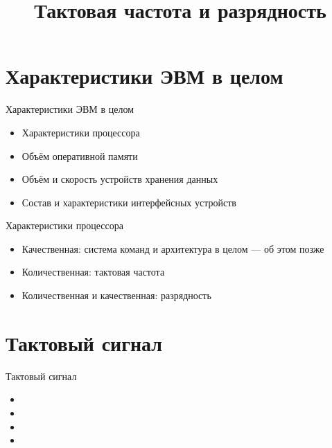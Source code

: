 \documentclass[xetex,aspectratio=43]{beamer}
\title[Тактовая частота и разрядность]{Тактовая частота и разрядность}
\begin{document}
\titleslide

\tocslide

\section{Характеристики ЭВМ в целом}

\begin{frame}{Характеристики ЭВМ в целом}
    \begin{itemize}
        \item Характеристики процессора
        \item Объём оперативной памяти
        \item Объём и скорость устройств хранения данных
        \item Состав и характеристики интерфейсных устройств
    \end{itemize}
\end{frame}

\begin{frame}{Характеристики процессора}
    \begin{itemize}
        \item Качественная: система команд и архитектура в целом --- об этом позже
        \item Количественная: тактовая частота
        \item Количественная и качественная: разрядность
    \end{itemize}
\end{frame}

\section{Тактовый сигнал}

\begin{frame}{Тактовый сигнал}
    \begin{itemize}
            \item {}
            \item {}
            \item {}
            \item {}
    \end{itemize}

\end{frame}
\end{document}
